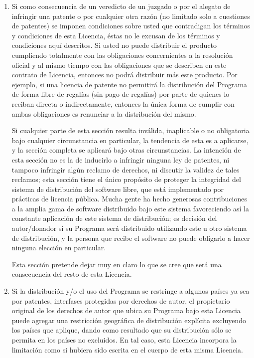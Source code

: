 \begin{enumerate}
\item  Si como consecuencia de un veredicto de un juzgado o por el alegato de infringir una patente o por cualquier otra razón (no limitado solo a cuestiones de patentes) se imponen condiciones sobre usted que contradigan los términos y condiciones de esta Licencia, éstas no le excusan de los términos y condiciones aquí descritos. Si usted no puede distribuir el producto cumpliendo totalmente con las obligaciones concernientes a la resolución oficial y al mismo tiempo con las obligaciones que se describen en este contrato de Licencia, entonces no podrá distribuir más este producto. Por ejemplo, si una licencia de patente no permitirá la distribución del Programa de forma libre de regalías (sin pago de regalías) por parte de quienes lo reciban directa o indirectamente, entonces la única forma de cumplir con ambas obligaciones es renunciar a la distribución del mismo. 

Si cualquier parte de esta sección resulta inválida, inaplicable o no obligatoria bajo cualquier circunstancia en particular, la tendencia de esta es a aplicarse, y la sección completa se aplicará bajo otras circunstancias. 
La intención de esta sección no es la de inducirlo a infringir ninguna ley de patentes, ni tampoco infringir algún reclamo de derechos, ni discutir la validez de tales reclamos; esta sección tiene el único propósito de proteger la integridad del sistema de distribución del software libre, que está implementado por prácticas de licencia pública. Mucha gente ha hecho generosas contribuciones a la amplia gama de software distribuido bajo este sistema favoreciendo así la constante aplicación de este sistema de distribución; es decisión del autor/donador si su Programa será distribuido utilizando este u otro sistema de distribución, y la persona que recibe el software no puede obligarlo a hacer ninguna elección en particular. 

Esta sección pretende dejar muy en claro lo que se cree que será una consecuencia del resto de esta Licencia. 

\item  Si la distribución y/o el uso del Programa se restringe a algunos países ya sea por patentes, interfases protegidas por derechos de autor, el propietario original de los derechos de autor que ubica su Programa bajo esta Licencia puede agregar una restricción geográfica de distribución explícita excluyendo los países que aplique, dando como resultado que su distribución sólo se permita en los países no excluidos. En tal caso, esta Licencia incorpora la limitación como si hubiera sido escrita en el cuerpo de esta misma Licencia. 


\end{enumerate}
